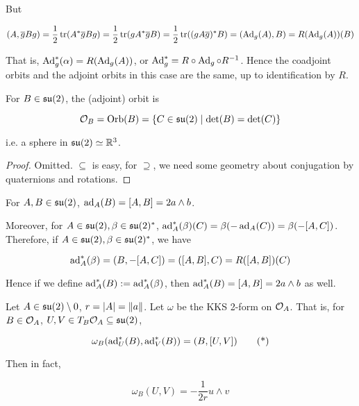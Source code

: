 \documentclass{article}
\newcommand{\su}{\mfs\mfu}
\begin{document}
But

\[(A, \overline g B g) = \frac{1}{2}\tr(A^*\overline g B g) = \frac{1}{2}\tr(gA^*\overline g B) = \frac{1}{2}\tr((gA\overline g)^*B) = (\operatorname{Ad}_g(A), B) = R(\operatorname{Ad}_g(A))(B)\]

That is, \(\operatorname{Ad}_g^*(\alpha) = R(\operatorname{Ad}_g(A))\), or \(\operatorname{Ad}_g^* = R \circ \operatorname{Ad}_g \circ R^{-1}\). Hence the coadjoint orbits and the adjoint orbits in this case are the same, up to identification by \(R\).

\begin{proposition}
    For \(B \in \su(2)\), the (adjoint) orbit is

    \[\mcO_B = \Orb(B) = \left\{C \in \su(2) \mid \det(B) = \det(C)\right\}\]

    i.e. a sphere in \(\su(2) \simeq \R^3\).
\end{proposition}

\begin{proof}
    Omitted. \(\subseteq\) is easy, for \(\supseteq\), we need some geometry about conjugation by quaternions and rotations.
\end{proof}

\begin{lemma}
    For \(A, B \in \su(2)\), \(\operatorname{ad}_A(B) = [A, B] = 2 a \wedge b\).
\end{lemma}

Moreover, for \(A \in \su(2), \beta \in \su(2)^*\), \(\operatorname{ad}_A^*(\beta)(C) = \beta(-\operatorname{ad}_A(C)) = \beta(-[A, C])\). Therefore, if \(A \in \su(2), \beta \in \su(2)^*\), we have

\[\operatorname{ad}_A^*(\beta) = (B, -[A, C]) = ([A, B], C) = R([A, B])(C)\]

Hence if we define \(\operatorname{ad}_A^*(B) := \operatorname{ad}_A^*(\beta)\), then \(\operatorname{ad}_A^*(B) = [A, B] = 2a\wedge b\) as well.

\begin{proposition}
    Let \(A \in \su(2) \setminus 0\), \(r = \abs{A} = \norm{a}\). Let \(\omega\) be the KKS 2-form on \(\mathcal{O}_A\). That is, for \(B \in \mathcal{O}_A\), \(U, V \in T_B\mcO_A \subseteq \su(2)\),

    \[\omega_B(\operatorname{ad}_U^*(B), \operatorname{ad}_V^*(B)) = (B, [U, V]) \tag{*}\]

    Then in fact,

    \[\omega_B(U, V) = -\frac{1}{2r}u \wedge v\]
\end{proposition}
\end{document}
